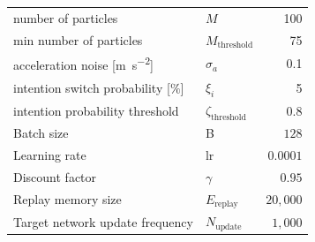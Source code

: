 \begin{table}[!h]
\begin{tabular}{l l r}
        number of particles & $M$ & 100\\
        min number of particles & $M_\mathrm{threshold}$ & 75\\
        acceleration noise [\unit{\meter\per\second\squared}] & $\sigma_a$ & 0.1 \\
        intention switch probability [$\%$] & $\xi_i$ & 5 \\
        intention probability threshold & $\zeta_\text{threshold}$ & 0.8 \\
        \midrule
        
        Batch size & B & $128$ \\
        Learning rate & lr & $0.0001$ \\
        Discount factor & $\gamma$ & $0.95$\\
        Replay memory size & $E_\mathrm{replay}$ & $20{,}000$\\
        Target network update frequency & $N_\mathrm{update}$ & $1{,}000$\\
    
    
            \bottomrule
        \end{tabular}
    \end{table}

